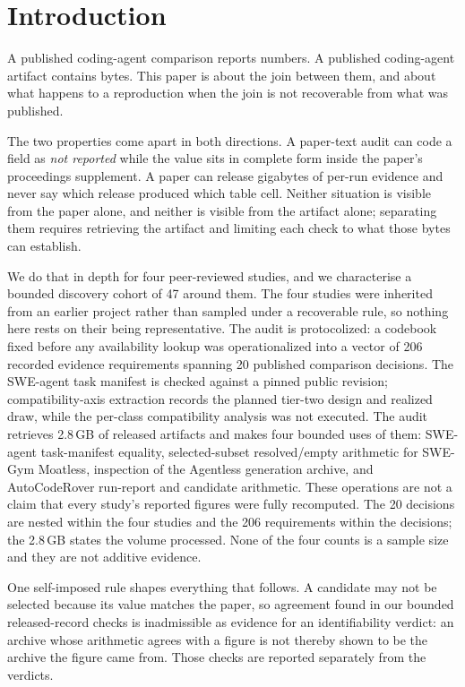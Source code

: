 \section{Introduction}
\label{sec:introduction}

A published coding-agent comparison reports numbers. A published coding-agent artifact
contains bytes. This paper is about the join between them, and about what happens to a
reproduction when the join is not recoverable from what was published.

The two properties come apart in both directions. A paper-text audit can code a field as
\emph{not reported} while the value sits in complete form inside the paper's proceedings
supplement. A paper can release gigabytes of per-run evidence and never say which release
produced which table cell. Neither situation is visible from the paper alone, and neither is
visible from the artifact alone; separating them requires retrieving the artifact and
limiting each check to what those bytes can establish.

We do that in depth for four peer-reviewed studies, and we characterise a bounded discovery
cohort of 47 around them. The four studies were inherited from an earlier project rather
than sampled under a recoverable rule, so nothing here rests on their being
representative. The audit is protocolized: a codebook fixed before any availability lookup
was operationalized into a vector of 206 recorded evidence requirements spanning 20 published
comparison decisions. The SWE-agent task manifest is checked against a pinned public revision;
compatibility-axis extraction records the planned tier-two design and realized draw, while the
per-class compatibility analysis was not executed. The
audit retrieves 2.8\,GB of released artifacts and makes
four bounded uses of them: SWE-agent task-manifest equality, selected-subset resolved/empty
arithmetic for SWE-Gym Moatless, inspection of the Agentless generation archive, and
AutoCodeRover run-report and candidate arithmetic. These operations are not a claim that
every study's reported figures were fully recomputed. The 20 decisions are nested within the
four studies and the 206 requirements within the decisions; the 2.8\,GB states the volume
processed. None of the four counts is a sample size and they are not additive evidence.

One self-imposed rule shapes everything that follows. A candidate may not be selected because
its value matches the paper, so agreement found in our bounded released-record checks is
inadmissible as evidence for an identifiability verdict: an archive whose arithmetic agrees
with a figure is not thereby shown to be the archive the figure came from. Those checks are
reported separately from the verdicts.

